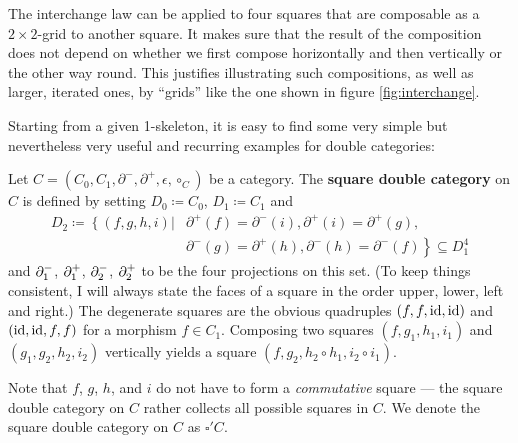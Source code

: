 The interchange law can be applied to four squares that are composable as a 
$2 \times 2$-grid to another square.
It makes sure that the result of the composition does not depend on whether we
first compose horizontally and then vertically or the other way round.
This justifies illustrating such compositions, as well as larger, iterated ones,
by ``grids'' like the one shown in figure \ref{fig:interchange}.

Starting from a given 1-skeleton, it is easy to find some very simple
but nevertheless very useful and recurring examples for double categories:

\begin{example} \label{def:sq-dbl-cat}
Let $C = (C_0, C_1, \partial^-, \partial^+, \epsilon, \circ_C)$ be a category. The
\textbf{square double category} on $C$ is defined by setting $D_0 \coloneqq C_0$,
$D_1 \coloneqq C_1$ and
\begin{align*}
D_2 \coloneqq \left\{ (f, g, h, i) \right| &\partial^+(f) = \partial^-(i), 
	\partial^+(i) = \partial^+(g), \\ %
	&\left.\partial^-(g) = \partial^+(h), 
	\partial^-(h) = \partial^-(f) \right\} \subseteq D_1^4
\end{align*}
and $\partial^-_1$, $\partial^+_1$, $\partial^-_2$, $\partial^+_2$ to be the four projections on
this set. (To keep things consistent, I will always state the faces of a square
in the order upper, lower, left and right.) The degenerate squares are the obvious
quadruples $(f, f, \operatorname{id}, \operatorname{id})$ and $(\operatorname{id}, \operatorname{id}, f, f)$ for a morphism $f \in C_1$.
Composing two squares $(f, g_1, h_1, i_1)$ and $(g_1, g_2, h_2, i_2)$ vertically
yields a square $(f, g_2, h_2 \circ h_1, i_2 \circ i_1)$.

Note that $f$, $g$, $h$, and $i$ do not have to form a \emph{commutative} square ---
the square double category on $C$ rather collects all possible squares in $C$.
We denote the square double category on $C$ as $\square'C$.
\end{example}

